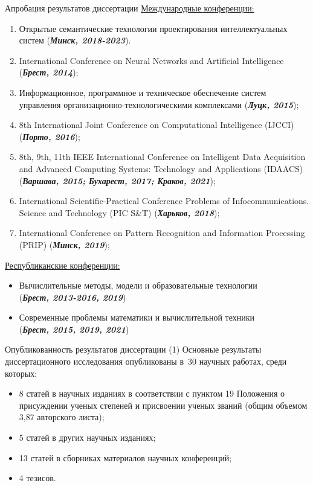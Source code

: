 \documentclass[10pt]{beamer}
\begin{document}
        \begin{frame}[shrink=5]{Апробация результатов диссертации}
            \small
            \underline{Международные конференции:}
            \begin{enumerate}
                \item Открытые семантические технологии проектирования интеллектуальных систем (\textbf{\textit{Минск, 2018-2023}}).
                \item International Conference on Neural Networks and Artificial Intelligence (\textbf{\textit{Брест, 2014}});
                \item Информационное, программное и техническое обеспечение систем управления организационно-технологическими комплексами (\textbf{\textit{Луцк, 2015}});
                \item 8th International Joint Conference on Computational Intelligence (IJCCI) (\textbf{\textit{Порто, 2016}});
                \item 8th, 9th, 11th IEEE International Conference on Intelligent Data Acquisition and Advanced Computing Systems: Technology and Applications (IDAACS) (\textbf{\textit{Варшава, 2015; Бухарест, 2017; Краков, 2021}}); 
                \item International Scientific-Practical Conference Problems of Infocommunications. Science and Technology (PIC S\&T) (\textbf{\textit{Харьков, 2018}});
                \item International Conference on Pattern Recognition and Information Processing (PRIP) (\textbf{\textit{Минск, 2019}});
            \end{enumerate}
            \underline{Республиканские конференции:}
            \begin{itemize}
                \item Вычислительные методы, модели и образовательные технологии \\ (\textbf{\textit{Брест, 2013-2016, 2019}})
                \item Современные проблемы математики и вычислительной техники \\ (\textbf{\textit{Брест, 2015, 2019, 2021}})
            \end{itemize}
        \end{frame}

        \begin{frame}{Опубликованность результатов диссертации (1)}
            Основные результаты диссертационного исследования опубликованы в~30 научных работах, среди которых: 
            \begin{itemize}
                \item 8 статей в научных изданиях в соответствии с пунктом 19 Положения о присуждении ученых степеней и присвоении ученых званий (общим объемом 3,87 авторского листа);
                \item 5 статей в других научных изданиях;
                \item 13 статей в сборниках материалов научных конференций;
                \item 4 тезисов.
            \end{itemize}
        \end{frame}
\end{document}
